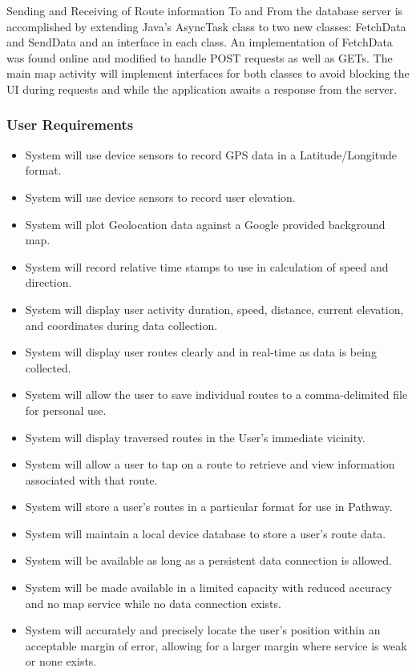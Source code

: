 ﻿\documentclass{article}
\begin{document}
Sending and Receiving of Route information To and From the database server is accomplished by extending Java's AsyncTask\cite{g_AsyncTask} class to two new classes: FetchData and SendData and an interface in each class. An implementation of FetchData was found online and modified to handle POST requests as well as GETs.\cite{g_asyncget} The main map activity will implement interfaces for both classes to avoid blocking the UI during requests and while the application awaits a response from the server.

\subsubsection{User Requirements}
\begin{itemize}
    \item System will use device sensors to record GPS data in a Latitude/Longitude format.
    \item System will use device sensors to record user elevation.
    \item System will plot Geolocation data against a Google provided background map.
    \item System will record relative time stamps to use in calculation of speed and direction.
    \item System will display user activity duration, speed, distance, current elevation, and coordinates during data collection.
    \item System will display user routes clearly and in real-time as data is being collected.
    \item System will allow the user to save individual routes to a comma-delimited file for personal use.
    \item System will display traversed routes in the User's immediate vicinity.
    \item System will allow a user to tap on a route to retrieve and view information associated with that route.
    \item System will store a user’s routes in a particular format for use in Pathway.
    \item System will maintain a local device database to store a user's route data.
    \item System will be available as long as a persistent data connection is allowed.
    \item System will be made available in a limited capacity with reduced accuracy and no map service while no data connection exists.
    \item System will accurately and precisely locate the user’s position within an acceptable margin of error, allowing for a larger margin where service is weak or none exists.
\end{itemize}
\end{document}
